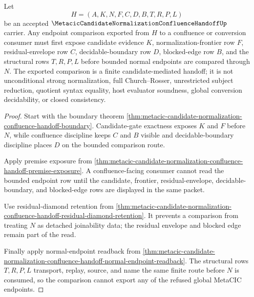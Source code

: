 \begin{theorem}
\label{thm:metacic-candidate-normalization-confluence-handoff-finite-endpoint-comparison}
Let
$$
H=(A,K,N,F,C,D,B,T,R,P,L)
$$
be an accepted $\MetacicCandidateNormalizationConfluenceHandoffUp$ carrier. Any endpoint comparison exported from $H$ to a confluence or conversion consumer must first expose candidate evidence $K$, normalization-frontier row $F$, residual-envelope row $C$, decidable-boundary row $D$, blocked-edge row $B$, and the structural rows $T,R,P,L$ before bounded normal endpoints are compared through $N$. The exported comparison is a finite candidate-mediated handoff; it is not unconditional strong normalization, full Church--Rosser, unrestricted subject reduction, quotient syntax equality, host evaluator soundness, global conversion decidability, or closed consistency.
\end{theorem}
\begin{proof}
Start with the boundary theorem \autoref{thm:metacic-candidate-normalization-confluence-handoff-boundary}. Candidate-gate exactness exposes $K$ and $F$ before $N$, while confluence discipline keeps $C$ and $B$ visible and decidable-boundary discipline places $D$ on the bounded comparison route.

Apply premise exposure from \autoref{thm:metacic-candidate-normalization-confluence-handoff-premise-exposure}. A confluence-facing consumer cannot read the bounded endpoint row until the candidate, frontier, residual-envelope, decidable-boundary, and blocked-edge rows are displayed in the same packet.

Use residual-diamond retention from \autoref{thm:metacic-candidate-normalization-confluence-handoff-residual-diamond-retention}. It prevents a comparison from treating $N$ as detached joinability data; the residual envelope and blocked edge remain part of the read.

Finally apply normal-endpoint readback from \autoref{thm:metacic-candidate-normalization-confluence-handoff-normal-endpoint-readback}. The structural rows $T,R,P,L$ transport, replay, source, and name the same finite route before $N$ is consumed, so the comparison cannot export any of the refused global MetaCIC endpoints.
\end{proof}

